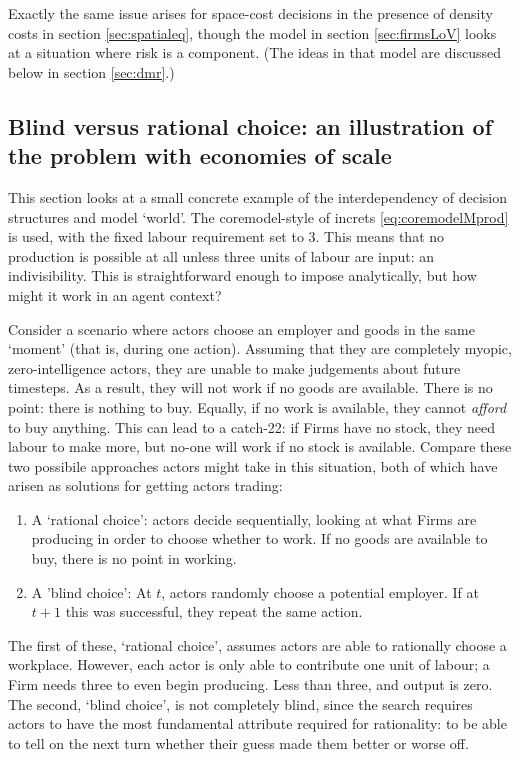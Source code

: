 {Exactly the same issue arises for space-cost decisions in the presence of density costs in section \ref{sec:spatialeq}, though the model in section \ref{sec:firmsLoV} looks at a situation where risk is a component. (The ideas in that model are discussed below in section \ref{sec:dmr}.)

\subsection{Blind versus rational choice: an illustration of the problem with economies of scale \label{sec:blindvsrational}}

This section looks at a small concrete example of the interdependency of decision structures and model `world'. The \gls{coremodel}-style of \gls{increts} \eqref{eq:coremodelMprod} is used, with the fixed labour requirement set to 3. This means that no production is possible at all unless three units of labour are input: an indivisibility. This is straightforward enough to impose analytically, but how might it work in an agent context? 

Consider a scenario where actors choose an employer and goods in the same `moment' (that is, during one action). Assuming that they are completely myopic, zero-intelligence actors, they are unable to make judgements about future timesteps. As a result, they will not work if no goods are available. There is no point: there is nothing to buy. Equally, if no work is available, they cannot \emph{afford} to buy anything. This can lead to a catch-22: if Firms have no stock, they need labour to make more, but no-one will work if no stock is available. Compare these two possibile approaches actors might take in this situation, both of which have arisen as solutions for getting actors trading:

\begin{enumerate}
	\item A `rational choice': actors decide sequentially, looking at what Firms are producing in order to choose whether to work. If no goods are available to buy, there is no point in working.
	\item A 'blind choice': At $t$, actors randomly choose a potential employer. If at $t+1$ this was successful, they repeat the same action. 
\end{enumerate}

The first of these, `rational choice', assumes actors are able to rationally choose a workplace. However, each actor is only able to contribute one unit of labour; a Firm needs three to even begin producing. Less than three, and output is zero. The second, `blind choice', is not completely blind, since the search requires actors to have the most fundamental attribute required for rationality: to be able to tell on the next turn whether their guess made them better or worse off. 

}
